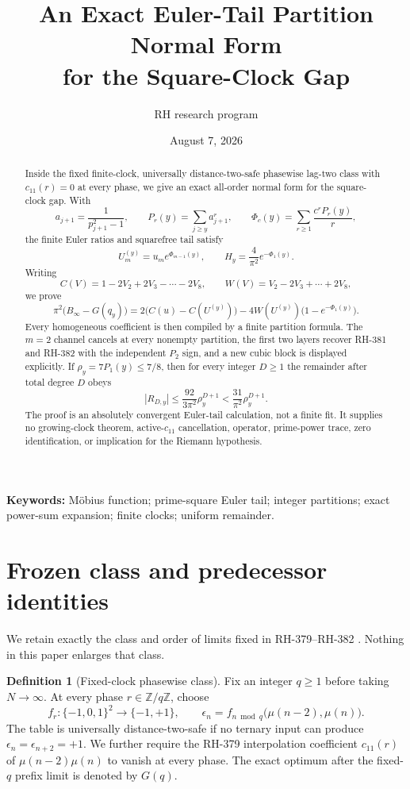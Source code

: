 \documentclass[11pt]{article}
\title{An Exact Euler-Tail Partition Normal Form\\
for the Square-Clock Gap}
\author{RH research program}
\date{August 7, 2026}
\theoremstyle{definition}
\newtheorem{definition}[theorem]{Definition}
\theoremstyle{remark}
\newcommand{\mob}{\mu}
\newcommand{\Z}{\mathbb Z}
\begin{document}
\maketitle

\begin{abstract}
Inside the fixed finite-clock, universally distance-two-safe phasewise
lag-two class with $c_{11}(r)=0$ at every phase, we give an exact all-order
normal form for the square-clock gap.  With
\[
 a_{j+1}=\frac1{p_{j+1}^{2}-1},\qquad
 P_r(y)=\sum_{j\ge y}a_{j+1}^{r},\qquad
 \Phi_c(y)=\sum_{r\ge1}\frac{c^rP_r(y)}r,
\]
the finite Euler ratios and squarefree tail satisfy
\[
 U_m^{(y)}=u_m e^{\Phi_{m-1}(y)},\qquad
 H_y=\frac4{\pi^2}e^{-\Phi_1(y)}.
\]
Writing
\[
 C(V)=1-2V_2+2V_3-\cdots-2V_8,
 \qquad W(V)=V_2-2V_3+\cdots+2V_8,
\]
we prove
\[
 \pi^2\bigl(B_\infty-G(q_y)\bigr)
 =2\bigl(C(u)-C(U^{(y)})\bigr)
  -4W(U^{(y)})\bigl(1-e^{-\Phi_1(y)}\bigr).
\]
Every homogeneous coefficient is then compiled by a finite partition
formula.  The $m=2$ channel cancels at every nonempty partition, the first
two layers recover RH-381 and RH-382 with the independent $P_2$ sign, and a
new cubic block is displayed explicitly.  If $\rho_y=7P_1(y)\le7/8$, then
for every integer $D\ge1$ the remainder after total degree $D$ obeys
\[
 |R_{D,y}|\le \frac{92}{3\pi^2}\rho_y^{D+1}
 <\frac{31}{\pi^2}\rho_y^{D+1}.
\]
The proof is an absolutely convergent Euler-tail calculation, not a finite
fit.  It supplies no growing-clock theorem, active-$c_{11}$ cancellation,
operator, prime-power trace, zero identification, or implication for the
Riemann hypothesis.
\end{abstract}

\noindent\textbf{Keywords:} M\"obius function; prime-square Euler tail;
integer partitions; exact power-sum expansion; finite clocks; uniform
remainder.

\section{Frozen class and predecessor identities}

We retain exactly the class and order of limits fixed in RH-379--RH-382
\cite{RH379,RH380,RH381,RH382}.  Nothing in this paper enlarges that class.

\begin{definition}[Fixed-clock phasewise class]
Fix an integer $q\ge1$ before taking $N\to\infty$.  At every phase
$r\in\Z/q\Z$, choose
\[
 f_r:\{-1,0,1\}^2\longrightarrow\{-1,+1\},\qquad
 \epsilon_n=f_{n\bmod q}\bigl(\mob(n-2),\mob(n)\bigr).
\]
The table is universally distance-two-safe if no ternary input can produce
$\epsilon_n=\epsilon_{n+2}=+1$.  We further require the RH-379 interpolation
coefficient $c_{11}(r)$ of $\mob(n-2)\mob(n)$ to vanish at every phase.
The exact optimum after the fixed-$q$ prefix limit is denoted by $G(q)$.
\end{definition}
\end{document}
